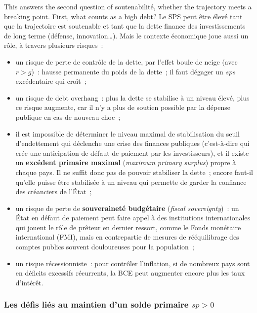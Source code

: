 This answers the second question of soutenabilité, whether the trajectory meets
a breaking point. First, what counts as a high debt? Le SPS peut être élevé tant
que la trajectoire est soutenable et tant que la dette finance des
investissements de long terme (défense, innovation…). Mais le contexte
économique joue aussi un rôle, à travers plusieurs risques~:
\begin{itemize}
  \item un risque de perte de contrôle de la dette, par l'effet boule de neige
    (avec $r > g$)~: hausse permanente du poids de la dette~; il faut dégager un
    $sps$ excédentaire qui croît~;
  \item un risque de debt overhang~: plus la dette se stabilise à un niveau
    élevé, plus ce risque augmente, car il n'y a plus de soutien possible par la
    dépense publique en cas de nouveau choc~;
  \item il est impossible de déterminer le niveau maximal de stabilisation du
    seuil d'endettement qui déclenche une crise des finances publiques
    (c'est-à-dire qui crée une anticipation de défaut de paiement par les
    investisseurs), et il existe un \textbf{excédent primaire maximal}
    (\textit{maximum primary surplus}) propre à chaque pays. Il ne suffit donc
    pas de pouvoir stabiliser la dette~; encore faut-il qu'elle puisse être
    stabilisée à un niveau qui permette de garder la confiance des créanciers
    de l'État~;
  \item un risque de perte de \textbf{souveraineté budgétaire}
    (\textit{fiscal sovereignty})~: un État en défaut de paiement peut faire
    appel à des institutions internationales qui jouent le rôle de prêteur en
    dernier ressort, comme le Fonds monétaire international (FMI), mais en
    contrepartie de mesures de rééquilibrage des comptes publics souvent
    douloureuses pour la population~;
  \item un risque récessionniste~: pour contrôler l'inflation, si de nombreux
    pays sont en déficits excessifs récurrents, la BCE peut augmenter encore plus
    les taux d'intérêt.
\end{itemize}

\subsubsection{Les défis liés au maintien d'un solde primaire $sp > 0$}


